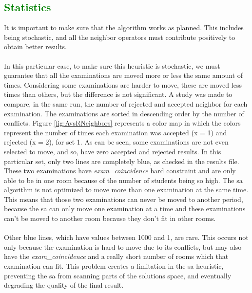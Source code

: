 \subsection{\textcolor{green}{Statistics}}
\label{sub:SAStatistics}
It is important to make sure that the algorithm works as planned. This includes being stochastic, and all the neighbor operators must contribute positively to obtain better results.\\
\\
In this particular case, to make sure this heuristic is stochastic, we must guarantee that all the examinations are moved more or less the same amount of times. Considering some examinations are harder to move, these are moved less times than others, but the difference is not significant. A study was made to compare, in the same run, the number of rejected and accepted neighbor for each examination. The examinations are sorted in descending order by the number of conflicts. Figure \ref{fig:AvsRNeighbors} represents a color map in which the colors represent the number of times each examination was accepted (x = 1) and rejected (x = 2), for set 1. As can be seen, some examinations are not even selected to move, and so, have zero accepted and rejected results. In this particular set, only two lines are completely blue, as checked in the results file. These two examinations have \textit{exam\_coincidence} hard constraint and are only able to be in one room because of the number of students being so high. The \gls{sa} algorithm is not optimized to move more than one examination at the same time. This means that those two examinations can never be moved to another period, because the \gls{sa} can only move one examination at a time and these examinations can't be moved to another room because they don't fit in other rooms.\\
\\
Other blue lines, which have values between 1000 and 1, are rare. This occurs not only because the examination is hard to move due to its conflicts, but may also have the \textit{exam\_coincidence} and a really short number of rooms which that examination can fit. This problem creates a limitation in the \gls{sa} heuristic, preventing the \gls{sa} from scanning parts of the solutions space, and eventually degrading the quality of the final result.\\
\\
